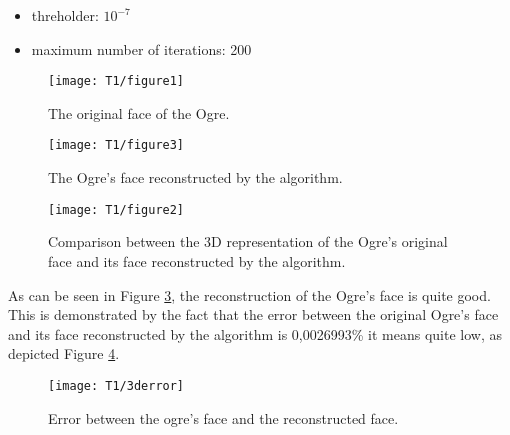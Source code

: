 \begin{itemize}
\item threholder: $10^{-7}$
\item maximum number of iterations: 200
\end{itemize}

\begin{figure}[h]
    \centering
    \texttt{[image: T1/figure1]}
    \caption{The original face of the Ogre.}
    \label{fig:real_ogre}
\end{figure}

\begin{figure}[h]
    \centering
    \texttt{[image: T1/figure3]}
    \caption{The Ogre's face reconstructed by the algorithm.}
    \label{fig:ogre}
\end{figure}

\begin{figure}[h!]
    \centering
    \texttt{[image: T1/figure2]}
    \caption{Comparison between the 3D representation of the Ogre's original face and its face reconstructed by the algorithm.}
    \label{fig:real_ogre_vs_ogre}
\end{figure}
\noindent As can be seen in Figure \ref{fig:real_ogre_vs_ogre}, the reconstruction of the Ogre's face is quite good. This is demonstrated by the fact that the error between the original Ogre's face and its face reconstructed by the algorithm is 0,0026993\% it means quite low, as depicted Figure \ref{fig:3d_error}.

\begin{figure}[h!]
    \centering
    \texttt{[image: T1/3derror]}
    \caption{Error between the ogre's face and the reconstructed face.}
    \label{fig:3d_error}
\end{figure}
